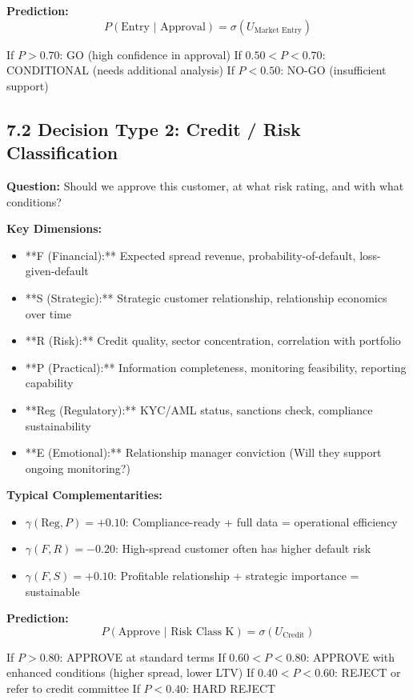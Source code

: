 \documentclass[11pt]{article}
\begin{document}
\textbf{Prediction:}
$$P(\text{Entry | Approval}) = \sigma(U_{\text{Market Entry}})$$

If $P > 0.70$: GO (high confidence in approval)
If $0.50 < P < 0.70$: CONDITIONAL (needs additional analysis)
If $P < 0.50$: NO-GO (insufficient support)

\subsection{7.2 Decision Type 2: Credit / Risk Classification}

\textbf{Question:} Should we approve this customer, at what risk rating, and with what conditions?

\textbf{Key Dimensions:}
\begin{itemize}
\item **F (Financial):** Expected spread revenue, probability-of-default, loss-given-default
\item **S (Strategic):** Strategic customer relationship, relationship economics over time
\item **R (Risk):** Credit quality, sector concentration, correlation with portfolio
\item **P (Practical):** Information completeness, monitoring feasibility, reporting capability
\item **Reg (Regulatory):** KYC/AML status, sanctions check, compliance sustainability
\item **E (Emotional):** Relationship manager conviction (Will they support ongoing monitoring?)
\end{itemize}

\textbf{Typical Complementarities:}
\begin{itemize}
\item $\gamma(\text{Reg}, P) = +0.10$: Compliance-ready + full data = operational efficiency
\item $\gamma(F, R) = -0.20$: High-spread customer often has higher default risk
\item $\gamma(F, S) = +0.10$: Profitable relationship + strategic importance = sustainable
\end{itemize}

\textbf{Prediction:}
$$P(\text{Approve | Risk Class K}) = \sigma(U_{\text{Credit}})$$

If $P > 0.80$: APPROVE at standard terms
If $0.60 < P < 0.80$: APPROVE with enhanced conditions (higher spread, lower LTV)
If $0.40 < P < 0.60$: REJECT or refer to credit committee
If $P < 0.40$: HARD REJECT
\end{document}
